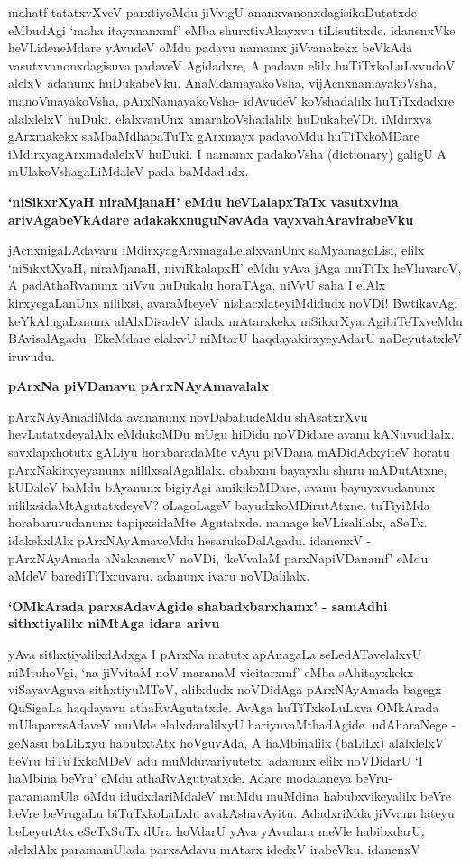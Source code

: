 mahatf tatatxvXveV parxtiyoMdu jiVvigU ananxvanonxdagisikoDutatxde eMbudAgi `maha itayxnanxmf' eMba shurxtivAkayxvu tiLisutitxde. idanenxVke heVLideneMdare yAvudeV oMdu padavu namamx jiVvanakekx beVkAda vasutxvanonxdagisuva padaveV Agidadxre, A padavu elilx huTiTxkoLuLxvudoV alelxV adanunx huDukabeVku. AnaMdamayakoVsha, vijAcnxnamayakoVsha, manoVmayakoVsha, pArxNamayakoVsha- idAvudeV koVshadalilx huTiTxdadxre alalxlelxV huDuki. elalxvanUnx amarakoVshadalilx huDukabeVDi. iMdirxya gArxmakekx saMbaMdhapaTuTx gArxmayx padavoMdu huTiTxkoMDare iMdirxyagArxmadalelxV huDuki. I namamx padakoVsha {\rm (dictionary)} galigU A mUlakoVshagaLiMdaleV pada baMdadudx.

{\bf `niSikxrXyaH niraMjanaH' eMdu heVLalapxTaTx vasutxvina arivAgabeVkAdare adakakxnuguNavAda vayxvahAravirabeVku} 

jAcnxnigaLAdavaru iMdirxyagArxmagaLelalxvanUnx saMyamagoLisi, elilx `niSikxtXyaH, niraMjanaH, niviRkalapxH' eMdu yAva jAga muTiTx heVluvaroV, A padAthaRvanunx niVvu huDukalu horaTAga, niVvU saha I elAlx kirxyegaLanUnx nililxsi, avaraMteyeV nishacxlateyiMdidudx noVDi! BwtikavAgi keYkAlugaLanunx alAlxDisadeV idadx mAtarxkekx niSikxrXyarAgibiTeTxveMdu BAvisalAgadu. EkeMdare elalxvU niMtarU haqdayakirxyeyAdarU naDeyutatxleV iruvudu.

{\bf pArxNa piVDanavu pArxNAyAmavalalx}

pArxNAyAmadiMda avananunx novDabahudeMdu shAsatxrXvu hevLutatxdeyalAlx eMdukoMDu mUgu hiDidu noVDidare avanu kANuvudilalx. savxlapxhotutx gALiyu horabaradaMte vAyu piVDana mADidAdxyiteV horatu pArxNakirxyeyanunx nililxsalAgalilalx. obabxnu bayayxlu shuru mADutAtxne, kUDaleV baMdu bAyanunx bigiyAgi amikikoMDare, avanu bayuyxvudanunx nililxsidaMtAgutatxdeyeV? oLagoLageV bayudxkoMDirutAtxne. tuTiyiMda horabaruvudanunx tapipxsidaMte Agutatxde. namage keVLisalilalx, aSeTx. idakekxlAlx pArxNAyAmaveMdu hesarukoDalAgadu. idanenxV - pArxNAyAmada aNakanenxV noVDi, `keVvalaM parxNapiVDanamf' eMdu aMdeV barediTiTxruvaru. adanunx ivaru noVDalilalx.

{\bf `OMkArada parxsAdavAgide shabadxbarxhamx' - samAdhi sithxtiyalilx niMtAga idara arivu}

yAva sithxtiyalilxdAdxga I pArxNa matutx apAnagaLa seLedATavelalxvU niMtuhoVgi, `na jiVvitaM noV maranaM vicitarxmf' eMba sAhitayxkekx viSayavAguva sithxtiyuMToV, alilxdudx noVDidAga pArxNAyAmada bagegx QuSigaLa haqdayavu athaRvAgutatxde. AvAga huTiTxkoLuLxva OMkArada mUlaparxsAdaveV muMde elalxdaralilxyU hariyuvaMthadAgide. udAharaNege - geNasu baLiLxyu habubxtAtx hoVguvAda, A haMbinalilx (baLiLx) alalxlelxV beVru biTuTxkoMDeV adu muMduvariyutetx. adanunx elilx noVDidarU `I haMbina beVru' eMdu athaRvAgutyatxde. Adare modalaneya beVru-paramamUla oMdu idudxdariMdaleV muMdu muMdina habubxvikeyalilx beVre beVre beVrugaLu biTuTxkoLaLxlu avakAshavAyitu. AdadxriMda jiVvana lateyu beLeyutAtx eSeTxSuTx dUra hoVdarU yAva yAvudara meVle habibxdarU, alelxlAlx paramamUlada parxsAdavu mAtarx idedxV irabeVku. idanenxV

